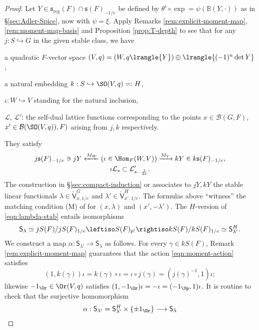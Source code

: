 \documentclass[a4paper,10pt]{article}
\begin{document}
\begin{proof}
	Let $Y \in \mathfrak{s}_{\text{reg}}(F) \cap \mathfrak{s}(F)_{-1/e}$ be defined by $\theta^\flat \circ \exp = \psi(\mathbb{B}(Y, \cdot))$ as in \S\ref{sec:Adler-Spice}, now with $\psi = \xi$. Apply Remarks \ref{rem:explicit-moment-map}, \ref{rem:moment-map-basis} and Proposition \ref{prop:T-depth} to see that for any $j: S \hookrightarrow G$ in the given stable class, we have
	\begin{compactitem}
		\item a quadratic $F$-vector space $(V,q) = (W, q\lrangle{Y}) \oplus \lrangle{(-1)^n \det Y}$,
		\item a natural embedding $k: S \hookrightarrow \SO(V,q) =: H$,
		\item $\iota: W \hookrightarrow V$ standing for the natural inclusion,
		\item $\mathcal{L}$, $\mathcal{L}'$: the self-dual lattice functions corresponding to the points $x \in \mathcal{B}(G, F)$, $x' \in \mathcal{B}(\SO(V,q)), F)$ arising from $j,k$ respectively.
	\end{compactitem}
	They satisfy 
	\begin{gather*}
		j\mathfrak{s}(F)_{-1/e} \ni jY \xleftarrow{M_W} \left( \iota \in \Hom_F(W,V) \right) \xrightarrow{M_V} kY \in k\mathfrak{s}(F)_{-1/e}, \\
		\iota\mathcal{L}_s \subset \mathcal{L}'_{s - \frac{1}{2e}}.
	\end{gather*}
	The construction in \S\ref{sec:compact-induction} or \cite[\S 3.3]{Kal15} associates to $jY, kY$ the stable linear functionals $\lambda \in \check{\mathsf{V}}^G_{x, 1/e}$ and $\lambda' \in \check{\mathsf{V}}^H_{x', 1/e}$. The formulas above ``witness'' the matching condition (M) of \cite[Proposition 1.2.1]{LMS16} for $(x, \lambda)$ and $(x', -\lambda')$. The $H$-version of \eqref{eqn:lambda-stab} entails isomorphisms
	\[ \mathsf{S}_\lambda \simeq jS(F)/jS(F)_{1/e} \leftiso S(F)_{p'} \rightiso kS(F)/kS(F)_{1/e} \simeq \mathsf{S}^H_{\lambda'}. \]
	We construct a map $\alpha: \mathsf{S}_{\lambda'} \to \mathsf{S}_\lambda$ as follows. For every $\gamma \in kS(F)$, Remark \ref{rem:explicit-moment-map} guarantees that the action \eqref{eqn:moment-action} satisfies
	\[ (1, k(\gamma)) \iota = k(\gamma) \circ \iota = \iota \circ j(\gamma) = (j(\gamma)^{-1}, 1) \iota; \]
	likewise $-1_{\Or} \in \Or(V,q)$ satisfies $(1, -1_{\Or}) \iota = -\iota = (-1_{\Sp} , 1) \iota$. It is routine to check that the surjective homomorphism
	\begin{align*}
		\alpha: \mathsf{S}_{\lambda'} = \mathsf{S}^H_{\lambda'} \times \{\pm 1_{\Or}\} & \longrightarrow \mathsf{S}_\lambda \\

\end{align*}
\end{proof}
\end{document}
